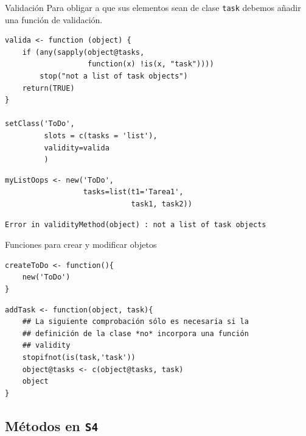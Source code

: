 \documentclass[xcolor={usenames,svgnames,dvipsnames}]{beamer}
\begin{document}
\begin{frame}[fragile,label={sec:orgf16ef07}]{Validación}
 Para obligar a que sus elementos sean de clase \texttt{task} debemos añadir
una función de validación.
\lstset{language=r,label= ,caption= ,captionpos=b,numbers=none}
\begin{lstlisting}
valida <- function (object) {
    if (any(sapply(object@tasks,
                   function(x) !is(x, "task")))) 
        stop("not a list of task objects")
    return(TRUE)
}

setClass('ToDo',
         slots = c(tasks = 'list'),
         validity=valida
         )
\end{lstlisting}

\lstset{language=r,label= ,caption= ,captionpos=b,numbers=none}
\begin{lstlisting}
myListOops <- new('ToDo',
                  tasks=list(t1='Tarea1',
                             task1, task2))
\end{lstlisting}

\begin{verbatim}
Error in validityMethod(object) : not a list of task objects
\end{verbatim}
\end{frame}

\begin{frame}[fragile,label={sec:orgb3b3daa}]{Funciones para crear y modificar objetos}
 \lstset{language=r,label= ,caption= ,captionpos=b,numbers=none}
\begin{lstlisting}
createToDo <- function(){
    new('ToDo')
}
\end{lstlisting}

\lstset{language=r,label= ,caption= ,captionpos=b,numbers=none}
\begin{lstlisting}
addTask <- function(object, task){
    ## La siguiente comprobación sólo es necesaria si la
    ## definición de la clase *no* incorpora una función 
    ## validity
    stopifnot(is(task,'task'))
    object@tasks <- c(object@tasks, task)
    object
}
\end{lstlisting}
\end{frame}


\subsection{Métodos en \texttt{S4}}
\label{sec:org81b1957}
\end{document}
